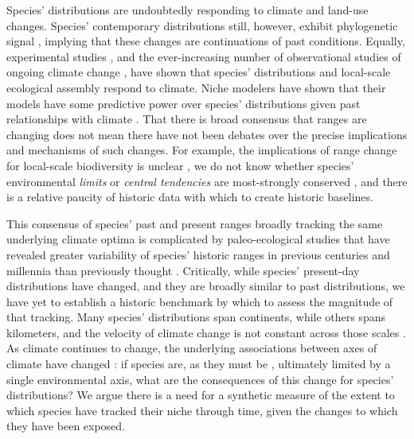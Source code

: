 \documentclass[12pt]{report}
\begin{document}
Species' distributions are undoubtedly responding to climate
\supercite{Parmesan2003,Parmesan2006} and land-use
\supercite{Newbold2015} changes. Species' contemporary distributions
still, however, exhibit phylogenetic signal \supercite{xxx}, implying
that these changes are continuations of past conditions. Equally,
experimental studies \supercite{xxx}, and the ever-increasing number
of observational studies of ongoing climate change \supercite{xxx},
have shown that species' distributions and local-scale ecological
assembly respond to climate. Niche modelers have shown that their
models have some predictive power over species' distributions given
past relationships with climate \supercite{xxx}. That there is broad
consensus that ranges are changing does not mean there have not been
debates over the precise implications and mechanisms of such
changes. For example, the implications of range change for local-scale
biodiversity is unclear
\supercite{Vellend2013,Dornelas2014,Gonzalez2016}, we do not know
whether species' environmental \emph{limits} or \emph{central
  tendencies} are most-strongly conserved
\supercite{deCasas2017,Zanne2018}, and there is a relative paucity of
historic data with which to create historic
baselines\supercite{Newbold2015,Meineke2018}.

This consensus of species' past and present ranges broadly tracking
the same underlying climate optima is complicated by paleo-ecological
studies that have revealed greater variability of species' historic
ranges in previous centuries and millennia than previously thought
\supercite{Williams2007,Veloz2012,Maguire2015}. Critically, while
species' present-day distributions have changed, and they are broadly
similar to past distributions, we have yet to establish a historic
benchmark by which to assess the magnitude of that tracking. Many
species' distributions span continents, while others spans kilometers,
and the velocity of climate change is not constant across those scales
\supercite{xxx}. As climate continues to change, the underlying
associations between axes of climate have changed \supercite{xxx}: if
species are, as they must be \supercite{xxx}, ultimately limited by a
single environmental axis, what are the consequences of this change
for species' distributions? We argue there is a need for a synthetic
measure of the extent to which species have tracked their niche
through time, given the changes to which they have been exposed.
\end{document}

